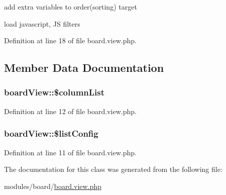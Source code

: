 add extra variables to order(sorting) target

load javascript, JS filters

Definition at line 18 of file board.\+view.\+php.



\subsection{Member Data Documentation}
\subsubsection[{\texorpdfstring{\$column\+List}{$columnList}}]{\setlength{\rightskip}{0pt plus 5cm}board\+View\+::\$column\+List}\hypertarget{classboardView_a44f0d3c92b73c34329708f5fe44652cc}{}\label{classboardView_a44f0d3c92b73c34329708f5fe44652cc}


Definition at line 12 of file board.\+view.\+php.

\subsubsection[{\texorpdfstring{\$list\+Config}{$listConfig}}]{\setlength{\rightskip}{0pt plus 5cm}board\+View\+::\$list\+Config}\hypertarget{classboardView_a8d64b7032d159a960972ae38f76897f8}{}\label{classboardView_a8d64b7032d159a960972ae38f76897f8}


Definition at line 11 of file board.\+view.\+php.



The documentation for this class was generated from the following file\+:\begin{DoxyCompactItemize}
\item 
modules/board/\hyperlink{board_8view_8php}{board.\+view.\+php}\end{DoxyCompactItemize}
